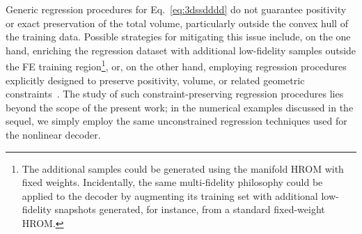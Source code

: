 \documentclass[preprint,10pt]{elsarticle}  %
\begin{document}
Generic regression procedures for Eq.~\ref{eq:3dssdddd} do not guarantee
positivity or exact preservation of the total volume, particularly outside the convex hull of the training data. Possible strategies for
mitigating this issue include, on the one hand, enriching the regression
dataset with additional low-fidelity samples outside the FE training
region\footnote{The additional samples could be generated
  using the manifold HROM with fixed weights. Incidentally, the
same multi-fidelity philosophy could be applied to the decoder by augmenting its training
set with additional low-fidelity snapshots generated, for instance, from a
standard fixed-weight HROM.}, or, on the other hand,
employing regression procedures explicitly designed to preserve positivity, volume,
or related geometric constraints~\cite{pennec2006riemannian}.  The study of such
constraint-preserving regression procedures lies beyond the scope of the
present work; in the numerical examples discussed in the sequel, we simply
employ the same unconstrained regression techniques used for the nonlinear
decoder.
\end{document}
